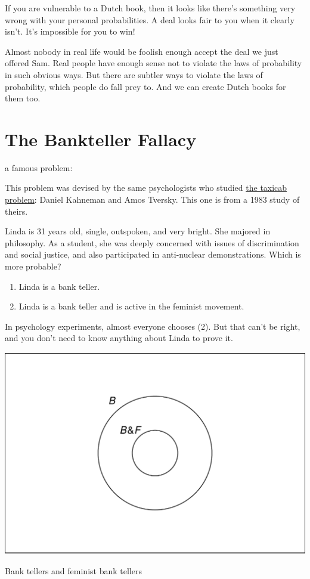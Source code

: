\documentclass[justified]{tufte-book}
\providecommand{\tightlist}{%
  \setlength{\itemsep}{0pt}\setlength{\parskip}{0pt}}
\theoremstyle{definition}
\theoremstyle{definition}
\theoremstyle{definition}
\theoremstyle{remark}
\let\BeginKnitrBlock\begin \let\EndKnitrBlock\end
\begin{document}
If you are vulnerable to a Dutch book, then it looks like there's something very wrong with your personal probabilities. A deal looks fair to you when it clearly isn't. It's impossible for you to win!

Almost nobody in real life would be foolish enough accept the deal we just offered Sam. Real people have enough sense not to violate the laws of probability in such obvious ways. But there are subtler ways to violate the laws of probability, which people do fall prey to. And we can create Dutch books for them too.

\hypertarget{bankteller}{%
\section{The Bankteller Fallacy}\label{bankteller}}

 a famous problem:

\begin{marginfigure}
This problem was devised by the same psychologists who studied
\protect\hyperlink{chbayes}{the taxicab problem}: Daniel Kahneman and
Amos Tversky. This one is from a 1983 study of theirs.
\end{marginfigure}

\BeginKnitrBlock{puzzle}
Linda is 31 years old, single, outspoken, and very bright. She majored in philosophy. As a student, she was deeply concerned with issues of discrimination and social justice, and also participated in anti-nuclear demonstrations. Which is more probable?

\begin{enumerate}
\def\labelenumi{\arabic{enumi}.}
\tightlist
\item
  Linda is a bank teller.
\item
  Linda is a bank teller and is active in the feminist movement.
\end{enumerate}
\EndKnitrBlock{puzzle}

In psychology experiments, almost everyone chooses (2). But that can't be right, and you don't need to know anything about Linda to prove it.

\begin{marginfigure}
\includegraphics{_main_files/figure-latex/bankteller-1} \caption[Bank tellers and feminist bank tellers]{Bank tellers and feminist bank tellers}\label{fig:bankteller}
\end{marginfigure}
\end{document}
